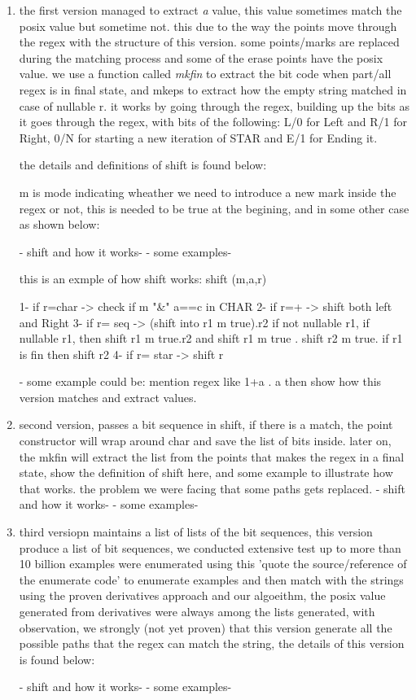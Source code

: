\documentclass[11pt]{article}
\begin{document}
\begin{enumerate}
    \item the first version managed to extract \emph{a} value, this value sometimes match the posix value but sometime not. 
this due to the way the points move through the regex with the structure of this version. some points/marks are replaced 
during the matching process and some of the erase points have the posix value.
we use a function called \emph{mkfin} to extract the bit code when part/all regex is in final state, and mkeps
to extract how the empty string matched in case of nullable r.  it works by going through the regex,
building up the bits as it goes through the regex, with bits of the following: L/0 for Left and R/1 for Right, 0/N for starting a new 
iteration of STAR and E/1 for Ending it. 

the details and definitions of shift is found below:

m is mode indicating wheather we need to introduce a new mark inside the regex or not, this is needed to 
be true at the begining, and in some other case as shown below:

- shift and how it works-
- some examples- 

this is an exmple of how shift works:
shift (m,a,r) %

1- if r=char -> check if m "&" a==c in CHAR
2- if r=+ -> shift both left and Right
3- if r= seq -> (shift into r1 m true).r2  if not nullable r1, if nullable r1, then shift r1 m true.r2 and shift r1 m true . shift r2 m true. if r1 is fin then shift r2
4- if r= star -> shift r

- some example could be: mention regex like 1+a . a then show how this version matches and extract values.

    \item second version, passes a bit sequence in shift, if there is a match, the point constructor will 
wrap around char and save the list of bits inside. later on, the mkfin will extract the list from the 
points that makes the regex in a final state, show the definition of shift here, and some example to
illustrate how that works. the problem we were facing that some paths gets replaced.
- shift and how it works-
- some examples- 

    \item third versiopn maintains a list of lists of the bit sequences, this version produce a list of bit
sequences, we conducted extensive test up to more than 10 billion examples were enumerated using this 'quote
the source/reference of the enumerate code' to enumerate examples and then match with the strings using
the proven derivatives approach and our algoeithm, the posix value generated from derivatives were always
among the lists generated, with observation, we strongly (not yet proven) that this version generate 
all the possible paths that the regex can match the string, the details of this version is found below:

- shift and how it works-
- some examples- 

\end{enumerate}




\end{document}
